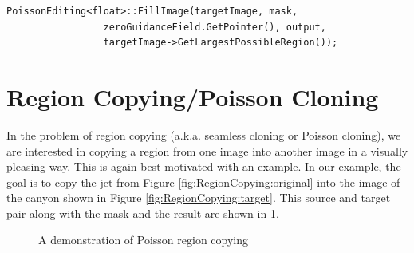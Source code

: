 \documentclass{InsightArticle}
\begin{document}
\begin{verbatim}
PoissonEditing<float>::FillImage(targetImage, mask,
				 zeroGuidanceField.GetPointer(), output,
				 targetImage->GetLargestPossibleRegion());
\end{verbatim}


\section{Region Copying/Poisson Cloning}
\label{sec:RegionCopying}
In the problem of region copying (a.k.a. seamless cloning or Poisson cloning), we are interested in copying a region from one image into another image in a visually pleasing way. This is again best motivated with an example. In our example, the goal is to copy the jet from Figure \ref{fig:RegionCopying:original} into the image of the canyon shown in Figure \ref{fig:RegionCopying:target}. This source and target pair along with the mask and the result are shown in \ref{fig:RegionCopying}.

\begin{figure}[H]
\centering
{}
\caption{A demonstration of Poisson region copying}
\label{fig:RegionCopying}
\end{figure}
\end{document}
